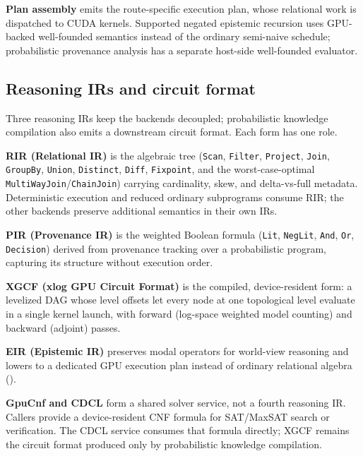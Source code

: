 \textbf{Plan assembly} emits the route-specific execution plan, whose relational work is dispatched to CUDA kernels. Supported negated epistemic recursion uses GPU-backed well-founded semantics instead of the ordinary semi-naive schedule; probabilistic provenance analysis has a separate host-side well-founded evaluator.

\subsection{Reasoning IRs and circuit format}

Three reasoning IRs keep the backends decoupled; probabilistic knowledge compilation also emits a downstream circuit format. Each form has one role.

\textbf{RIR (Relational IR)} is the algebraic tree (\texttt{Scan}, \texttt{Filter}, \texttt{Project}, \texttt{Join}, \texttt{GroupBy}, \texttt{Union}, \texttt{Distinct}, \texttt{Diff}, \texttt{Fixpoint}, and the worst-case-optimal \texttt{MultiWayJoin}/\texttt{ChainJoin}) carrying cardinality, skew, and delta-vs-full metadata. Deterministic execution and reduced ordinary subprograms consume RIR; the other backends preserve additional semantics in their own IRs.

\textbf{PIR (Provenance IR)} is the weighted Boolean formula (\texttt{Lit}, \texttt{NegLit}, \texttt{And}, \texttt{Or}, \texttt{Decision}) derived from provenance tracking over a probabilistic program, capturing its structure without execution order.

\textbf{XGCF (xlog GPU Circuit Format)} is the compiled, device-resident form: a levelized DAG whose level offsets let every node at one topological level evaluate in a single kernel launch, with forward (log-space weighted model counting) and backward (adjoint) passes.

\textbf{EIR (Epistemic IR)} preserves modal operators for world-view reasoning and lowers to a dedicated GPU execution plan instead of ordinary relational algebra ().

\textbf{GpuCnf and CDCL} form a shared solver service, not a fourth reasoning IR. Callers provide a device-resident CNF formula for SAT/MaxSAT search or verification. The CDCL service consumes that formula directly; XGCF remains the circuit format produced only by probabilistic knowledge compilation.
